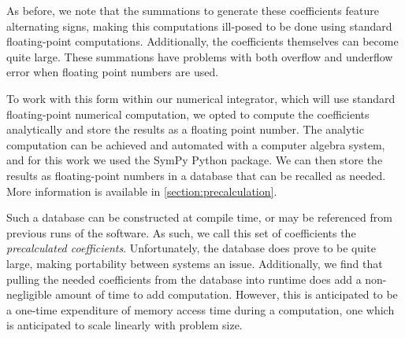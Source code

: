 As before, we note that the summations to generate these coefficients feature
alternating signs, making this computations ill-posed to be done using standard
floating-point computations. Additionally, the coefficients themselves can
become quite large. These summations have problems with both overflow and
underflow error when floating point numbers are used.

To work with this form within our numerical integrator, which will use standard
floating-point numerical computation, we opted to compute the coefficients
analytically and store the results as a floating point number. The analytic
computation can be achieved and automated with a computer algebra system, and
for this work we used the SymPy Python package. We can then store the results as
floating-point numbers in a database that can be recalled as needed. More
information is available in \ref{section:precalculation}.

Such a database can be constructed at compile time, or may be referenced from
previous runs of the software. As such, we call this set of coefficients the
\emph{precalculated coefficients}. Unfortunately, the database does prove to be
quite large, making portability between systems an issue. Additionally, we find
that pulling the needed coefficients from the database into runtime does add a
non-negligible amount of time to add computation. However, this is anticipated
to be a one-time expenditure of memory access time during a computation, one
which is anticipated to scale linearly with problem size.

